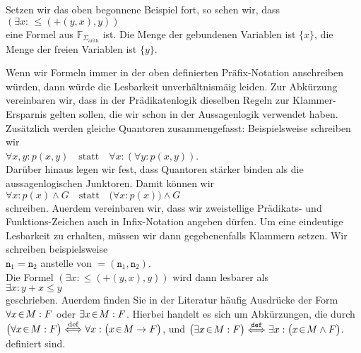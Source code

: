\example
Setzen wir das oben begonnene Beispiel fort, so  sehen wir, dass \\[0.2cm]
\hspace*{1.3cm} $(\exists x \colon\, \leq\!(\mathtt{+}(y, x),y))$ \\[0.2cm]
eine Formel aus $\mathbb{F}_{\Sigma_{\mathrm{arith}}}$ ist. 
Die Menge der gebundenen Variablen ist $\{x\}$, die Menge der freien Variablen ist 
$\{ y \}$. \eox

Wenn wir Formeln immer in der oben definierten Pr\"{a}fix-Notation anschreiben w\"{u}rden, dann w\"{u}rde die Lesbarkeit unverh\"{a}ltnism\"{a}\3ig leiden. 
Zur Abk\"{u}rzung vereinbaren wir, dass in der Pr\"{a}dikatenlogik dieselben Regeln zur Klammer-Ersparnis
gelten sollen,  die wir schon in der Aussagenlogik verwendet haben.  Zus\"{a}tzlich werden
gleiche Quantoren zusammengefasst: Beispielsweise schreiben wir  
\\[0.2cm]
\hspace*{1.3cm}
$\forall x, y \colon p(x, y)  \quad \mathrm{statt} \quad \forall x \colon ( \forall y \colon p(x,y))$.
\\[0.2cm]
Dar\"{u}ber hinaus legen wir fest, dass Quantoren st\"{a}rker binden als die aussagenlogischen Junktoren.
Damit k\"{o}nnen wir
\\[0.2cm]
\hspace*{1.3cm}
$\forall x \colon p(x) \wedge G \quad \mathrm{statt} \quad \bigl(\forall x \colon p(x)\bigr) \wedge G$
\\[0.2cm]
schreiben.
Au\3erdem vereinbaren wir, dass wir zweistellige Pr\"{a}dikats- und Funktions-Zeichen auch in Infix-Notation angeben
d\"{u}rfen.  Um eine eindeutige Lesbarkeit zu erhalten, m\"{u}ssen wir dann gegebenenfalls Klammern setzen. 
Wir schreiben beispielsweise \\[0.2cm]
\hspace*{1.3cm} $\mathtt{n}_1 = \mathtt{n}_2$  \quad anstelle von \quad $=(\mathtt{n}_1, \mathtt{n}_2)$. \\[0.2cm]
Die Formel $(\exists x \colon \leq(\mathtt{+}(y, x),y))$ wird dann lesbarer als \\[0.2cm]
\hspace*{1.3cm} $\exists x \colon y + x \leq y$ \\[0.2cm]
geschrieben.  Au\3erdem finden Sie in der Literatur h\"{a}ufig Ausdr\"{u}cke der Form
$\forall x\!\in\! M: F$ oder $\exists x\!\in\! M: F$.  Hierbei handelt es sich um Abk\"{u}rzungen, die durch
\\[0.2cm]
\hspace*{1.3cm}
$\displaystyle \bigl(\forall x\!\in\! M: F\bigr) \stackrel{\mathrm{def}}{\Longleftrightarrow} \forall x: \bigl(x \!\in\! M \rightarrow F\bigr)$,
\quad und \quad 
$\displaystyle\bigl(\exists x\!\in\! M: F\bigr) \stackrel{\mathtt{def}}{\Longleftrightarrow} \exists x: \bigl(x \!\in\! M \wedge F\bigr)$.
\\[0.2cm]
definiert sind.

